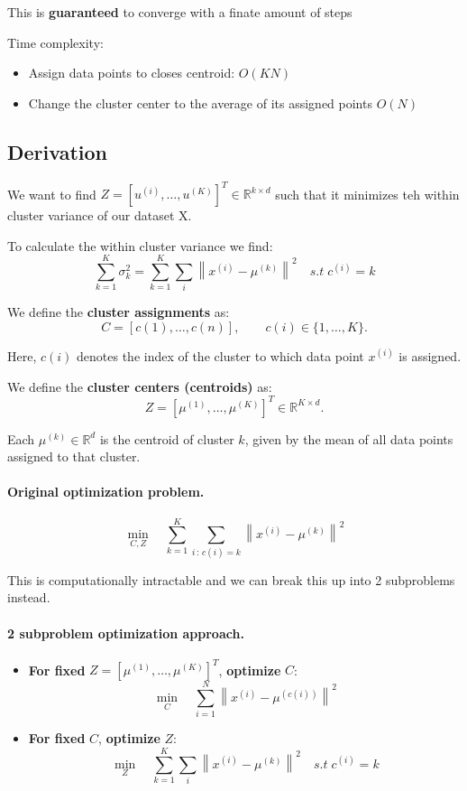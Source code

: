 \documentclass[11pt]{article}
\begin{document}
This is \textbf{guaranteed} to converge with a finate amount of steps
\medskip

Time complexity:
\begin{itemize}
	\item Assign data points to closes centroid: $O(KN)$
	\item Change the cluster center to the average of its assigned points $O(N)$
\end{itemize}

\subsection*{Derivation}

We want to find $Z = [u^{(i)}, \dots, u^{(K)}]^T \in \mathbb{R}^{k \times d}$ such that it minimizes teh within cluster variance of our dataset X.

To calculate the within cluster variance we find:
\[
	\sum_{k=1}^{K} \sigma_k^2
	=
	\sum_{k=1}^{K} \sum_{i} \left\| x^{(i)} - \mu^{(k)} \right\|^2 \quad s.t \; c^{(i)} = k
\]

We define the \textbf{cluster assignments} as:
\[
	C = [c(1), \dots, c(n)], \qquad c(i) \in \{1, \dots, K\}.
\]

Here, $c(i)$ denotes the index of the cluster to which data point $x^{(i)}$ is assigned.

\medskip

We define the \textbf{cluster centers (centroids)} as:
\[
	Z = [\mu^{(1)}, \dots, \mu^{(K)}]^T \in \mathbb{R}^{K \times d}.
\]

Each $\mu^{(k)} \in \mathbb{R}^d$ is the centroid of cluster $k$, given by the mean of all data points assigned to that cluster.

\paragraph{Original optimization problem.}
\[
	\min_{C, Z} \quad \sum_{k=1}^{K} \sum_{i \,:\, c(i)=k} \left\| x^{(i)} - \mu^{(k)} \right\|^2
\]

This is computationally intractable and we can break this up into 2 subproblems instead.

\paragraph{2 subproblem optimization approach.}

\begin{itemize}
	\item \textbf{For fixed } $Z = [\mu^{(1)}, \dots, \mu^{(K)}]^T$, \textbf{optimize } $C$:
	      \[
		      \min_{C} \quad \sum_{i=1}^{N} \left\| x^{(i)} - \mu^{(c(i))} \right\|^2
	      \]

	\item \textbf{For fixed } $C$, \textbf{optimize } $Z$:
	      \[
		      \min_{Z} \quad \sum_{k=1}^{K} \sum_{i} \left\| x^{(i)} - \mu^{(k)} \right\|^2\quad s.t \; c^{(i)} = k
	      \]

\end{itemize}
\end{document}
